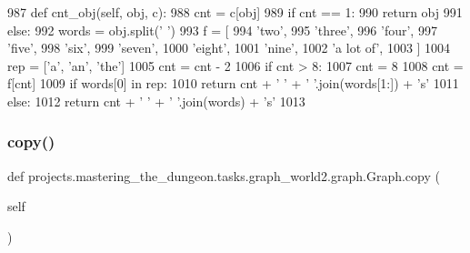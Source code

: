 \begin{DoxyCode}
987     \textcolor{keyword}{def }cnt\_obj(self, obj, c):
988         cnt = c[obj]
989         \textcolor{keywordflow}{if} cnt == 1:
990             \textcolor{keywordflow}{return} obj
991         \textcolor{keywordflow}{else}:
992             words = obj.split(\textcolor{stringliteral}{' '})
993             f = [
994                 \textcolor{stringliteral}{'two'},
995                 \textcolor{stringliteral}{'three'},
996                 \textcolor{stringliteral}{'four'},
997                 \textcolor{stringliteral}{'five'},
998                 \textcolor{stringliteral}{'six'},
999                 \textcolor{stringliteral}{'seven'},
1000                 \textcolor{stringliteral}{'eight'},
1001                 \textcolor{stringliteral}{'nine'},
1002                 \textcolor{stringliteral}{'a lot of'},
1003             ]
1004             rep = [\textcolor{stringliteral}{'a'}, \textcolor{stringliteral}{'an'}, \textcolor{stringliteral}{'the'}]
1005             cnt = cnt - 2
1006             \textcolor{keywordflow}{if} cnt > 8:
1007                 cnt = 8
1008             cnt = f[cnt]
1009             \textcolor{keywordflow}{if} words[0] \textcolor{keywordflow}{in} rep:
1010                 \textcolor{keywordflow}{return} cnt + \textcolor{stringliteral}{' '} + \textcolor{stringliteral}{' '}.join(words[1:]) + \textcolor{stringliteral}{'s'}
1011             \textcolor{keywordflow}{else}:
1012                 \textcolor{keywordflow}{return} cnt + \textcolor{stringliteral}{' '} + \textcolor{stringliteral}{' '}.join(words) + \textcolor{stringliteral}{'s'}
1013 
\end{DoxyCode}
\mbox{\label{classprojects_1_1mastering__the__dungeon_1_1tasks_1_1graph__world2_1_1graph_1_1Graph_aa5f7e25bb9caf56472851221896c985f}} 
\subsubsection{\texorpdfstring{copy()}{copy()}}
{\footnotesize\ttfamily def projects.\+mastering\+\_\+the\+\_\+dungeon.\+tasks.\+graph\+\_\+world2.\+graph.\+Graph.\+copy (\begin{DoxyParamCaption}\item[{}]{self }\end{DoxyParamCaption})}



